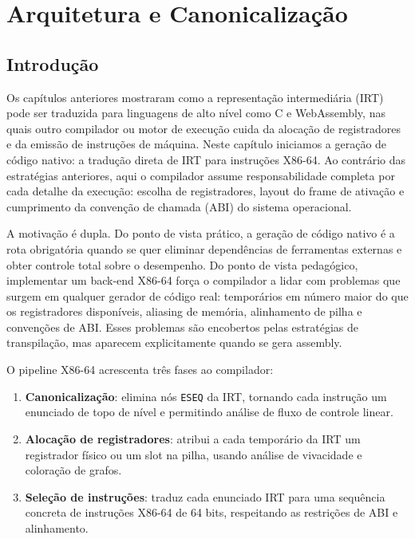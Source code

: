 \chapter{Arquitetura e Canonicalização}\label{chap:x86-arch}

\section{Introdução}

Os capítulos anteriores mostraram como a representação intermediária (IRT)
pode ser traduzida para linguagens de alto nível como C e WebAssembly, nas
quais outro compilador ou motor de execução cuida da alocação de
registradores e da emissão de instruções de máquina. Neste capítulo
iniciamos a geração de código nativo: a tradução direta de IRT para
instruções X86-64. Ao contrário das estratégias anteriores, aqui o
compilador assume responsabilidade completa por cada detalhe da execução:
escolha de registradores, layout do frame de ativação e cumprimento da
convenção de chamada (ABI) do sistema operacional.

A motivação é dupla. Do ponto de vista prático, a geração de código nativo
é a rota obrigatória quando se quer eliminar dependências de ferramentas
externas e obter controle total sobre o desempenho. Do ponto de vista
pedagógico, implementar um back-end X86-64 força o compilador a lidar com
problemas que surgem em qualquer gerador de código real: temporários em
número maior do que os registradores disponíveis, aliasing de memória,
alinhamento de pilha e convenções de ABI. Esses problemas são encobertos
pelas estratégias de transpilação, mas aparecem explicitamente quando se gera
assembly.

O pipeline X86-64 acrescenta três fases ao compilador:

\begin{enumerate}
  \item \textbf{Canonicalização}: elimina nós \texttt{ESEQ} da IRT, tornando
    cada instrução um enunciado de topo de nível e permitindo análise de
    fluxo de controle linear.
  \item \textbf{Alocação de registradores}: atribui a cada temporário da IRT
    um registrador físico ou um slot na pilha, usando análise de vivacidade e
    coloração de grafos.
  \item \textbf{Seleção de instruções}: traduz cada enunciado IRT para uma
    sequência concreta de instruções X86-64 de 64 bits, respeitando as
    restrições de ABI e alinhamento.
\end{enumerate}

